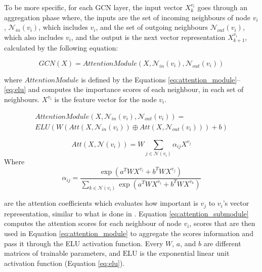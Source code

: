 To be more specific, for each GCN layer, the input vector $X^{v_i}_k$ 
goes through an aggregation phase where,
the inputs are the set of incoming neighbours of node $v_i$, $\mathcal{N}_{in}(v_i)$, which includes
$v_i$, and the set of outgoing neighbours $\mathcal{N}_{out}(v_i)$, which also includes $v_i$,
and the output is
the next vector representation $X^{v_i}_{k+1}$, calculated by the following equation:

\begin{equation}
GCN(X) = AttentionModule(X, \mathcal{N}_{in}(v_i), \mathcal{N}_{out}(v_i))
\end{equation}

where $AttentionModule$ is defined by the Equations \ref{eq:attention_module}--\ref{eq:elu}
and computes the importance scores of each neighbour, in each set of neighbours.
$X^{v_i}$ is the feature vector for the node $v_i$.

\begin{multline}
    AttentionModule(X, \mathcal{N}_{in}(v_i), \mathcal{N}_{out}(v_i)) = \\
    ELU\left( W \left( Att(X, \mathcal{N}_{in}(v_i)) \oplus Att(X, \mathcal{N}_{out}(v_i)) \right) + b \right)
    \label{eq:attention_module}
\end{multline}

\begin{equation}
Att(X, \mathcal{N}(v_i)) = W\sum_{j \in \mathcal{N}(v_i)} \alpha_{ij} X^{v_j}
\label{eq:attention_submodule}
\end{equation}
Where 
\begin{equation}
    \alpha_{ij} = \frac{\exp \left ({ a ^{T} W X^{v_i} + b ^{T} W X^{v_j} }\right )}
    {{\sum _{k \in \mathcal {N}(v_{i})}} \exp \left ({ a ^{T} W X^{v_i} + b ^{T} W X^{v_k} }\right )}
\end{equation}

are the attention coefficients
which evaluates how important is $v_j$ to $v_i$'s vector 
representation, similar to what is done in \citet{Lee2021GlobalDagSchedDRL}.
Equation \ref{eq:attention_submodule} computes the attention scores
for each neighbour of node $v_i$, 
scores that are then used in Equation \ref{eq:attention_module}
to aggregate the scores information and pass it through 
the ELU activation function.
Every $W$, $a$, and $b$ are different matrices of trainable parameters,
and $\text{ELU}$ is the exponential linear unit activation function (Equation \ref{eq:elu}).

